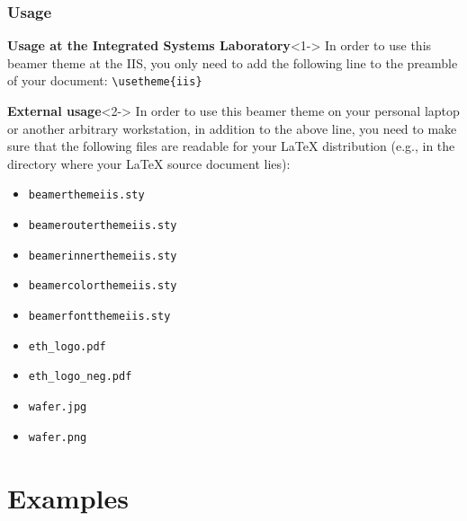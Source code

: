 \documentclass{beamer}
\newcommand\latexcls[1]{\textsf{#1}}
\begin{document}
\begin{frame}[%
  fragile %
]
  \frametitle{Usage}
  \vfill
  \begin{block}{\textbf{Usage at the Integrated Systems Laboratory}}<1->
    In order to use this \latexcls{beamer} theme at the IIS, you only
    need to add the following line to the preamble of your document:
    \lstinline[style=latexcodestyle]!\usetheme{iis}! 
  \end{block}
  \begin{block}{\textbf{External usage}}<2->
    In order to use this \latexcls{beamer} theme on your personal
    laptop or another arbitrary workstation, in addition to the above
    line, you need to make sure that the following files are readable
    for your \LaTeX{} distribution (e.g., in the directory where your
    \LaTeX{} source document lies):
    \begin{center}
    \footnotesize
    \begin{minipage}[b]{0.45\linewidth}
      \begin{itemize}\itemsep0pt
      \item \texttt{beamerthemeiis.sty}
      \item \texttt{beamerouterthemeiis.sty}
      \item \texttt{beamerinnerthemeiis.sty}
      \item \texttt{beamercolorthemeiis.sty}
      \item \texttt{beamerfontthemeiis.sty}
      \end{itemize}
    \end{minipage} \hfill
    \begin{minipage}[b]{0.45\linewidth}
      \begin{itemize}\itemsep0pt
      \item \texttt{eth\_logo.pdf}
      \item \texttt{eth\_logo\_neg.pdf}
      \item \texttt{wafer.jpg}
      \item \texttt{wafer.png}
      \end{itemize}
    \end{minipage} \hfill
    \end{center}
  \end{block}

\end{frame}


\section{Examples}
\end{document}
